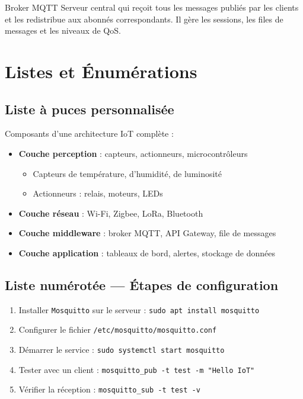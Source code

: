 \documentclass[12pt,a4paper]{report}
\begin{document}
\vspace{0.8em}

\begin{definitionbox}{Broker MQTT}
    Serveur central qui reçoit tous les messages publiés par les clients et les 
    redistribue aux abonnés correspondants. Il gère les sessions, les files de messages
    et les niveaux de QoS.
\end{definitionbox}

\section{Listes et Énumérations}

\subsection{Liste à puces personnalisée}

Composants d'une architecture IoT complète :

\begin{itemize}
    \item \textbf{Couche perception} : capteurs, actionneurs, microcontrôleurs
        \begin{itemize}
            \item Capteurs de température, d'humidité, de luminosité
            \item Actionneurs : relais, moteurs, LEDs
        \end{itemize}
    \item \textbf{Couche réseau} : Wi-Fi, Zigbee, LoRa, Bluetooth
    \item \textbf{Couche middleware} : broker MQTT, API Gateway, file de messages
    \item \textbf{Couche application} : tableaux de bord, alertes, stockage de données
\end{itemize}

\subsection{Liste numérotée — Étapes de configuration}

\begin{enumerate}
    \item Installer \texttt{Mosquitto} sur le serveur : \texttt{sudo apt install mosquitto}
    \item Configurer le fichier \texttt{/etc/mosquitto/mosquitto.conf}
    \item Démarrer le service : \texttt{sudo systemctl start mosquitto}
    \item Tester avec un client : \texttt{mosquitto\_pub -t test -m "Hello IoT"}
    \item Vérifier la réception : \texttt{mosquitto\_sub -t test -v}
\end{enumerate}
\end{document}
